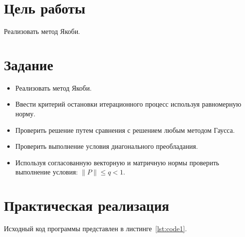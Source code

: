 \documentclass[a4paper, 14pt]{extarticle}
\begin{document}
\renewcommand{\ttdefault}{pcr}

\setlength{\tabcolsep}{3pt}
\newpage
\setcounter{page}{2}

\section{Цель работы}\label{Sect::goal}

Реализовать метод Якоби.

\section{Задание}\label{Sect::task}

\begin{itemize}
    \item Реализовать метод Якоби.
    \item Ввести критерий остановки итерационного процесс используя равномерную норму.
    \item Проверить решение путем сравнения с решением любым методом Гаусса.
    \item Проверить выполнение условия диагонального преобладания.
    \item Используя согласованную векторную и матричную нормы проверить выполнение условия: $\parallel P \parallel  \leq q < 1$.
\end{itemize}

\section{Практическая реализация}\label{Sect::code}

Исходный код программы представлен в листинге~\ref{lst:code1}.
\end{document}

